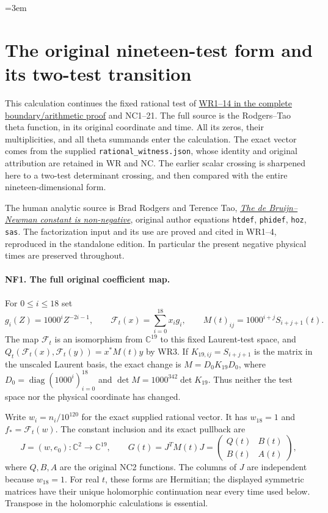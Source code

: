 \begingroup
\emergencystretch=3em
\section{The original nineteen-test form and its two-test transition}
\label{sec:native-full-flag}

This calculation continues the fixed rational test of
\href{https://github.com/KokunoYumeto/zeta-function-research-reader/blob/87e386271c488ce5914b9926c4d23d0857e0c367/workbenches/splitzero-tandem/continuations/20260923-boundary-residue-arithmetic/BOUNDARY_RESIDUE_ARITHMETIC_RECEIVERS.tex}
{WR1--14 in the complete boundary/arithmetic proof} and
NC1--21. The full source is the Rodgers--Tao theta function, in its
original coordinate and time. All its zeros, their multiplicities,
and all theta summands enter the calculation. The exact vector comes
from the supplied \texttt{rational\_witness.json}, whose identity and
original attribution are retained in WR and NC. The earlier scalar
crossing is sharpened here to a two-test determinant crossing, and
then compared with the entire nineteen-dimensional form.

The human analytic source is Brad Rodgers and Terence Tao,
\href{https://arxiv.org/abs/1801.05914v5}{\emph{The de Bruijn--Newman
constant is non-negative}}, original author equations
\texttt{htdef}, \texttt{phidef}, \texttt{hoz}, \texttt{sas}.
The factorization input and its use are proved and cited in WR1--4,
reproduced in the standalone edition. In particular the present
negative physical times are preserved throughout.

\paragraph{NF1. The full original coefficient map.}
For $0\le i\le18$ set
\[
 g_i(Z)=1000^iZ^{-2i-1},\qquad
 \mathcal F_t(x)=\sum_{i=0}^{18}x_i g_i,
 \qquad M(t)_{ij}=1000^{i+j}S_{i+j+1}(t).
 \tag{NF1}
\]
The map $\mathcal F_t$ is an isomorphism from $\mathbb C^{19}$ to
this fixed Laurent-test space, and
$Q_t(\mathcal F_t(x),\mathcal F_t(y))=x^*M(t)y$ by WR3.
If $K_{19,ij}=S_{i+j+1}$ is the matrix in the unscaled Laurent
basis, the exact change is $M=D_0K_{19}D_0$, where
$D_0=\operatorname{diag}(1000^i)_{i=0}^{18}$ and
$\det M=1000^{342}\det K_{19}$. Thus neither the test space nor
the physical coordinate has changed.

Write $w_i=n_i/10^{120}$ for the exact supplied rational vector.
It has $w_{18}=1$ and $f_* =\mathcal F_t(w)$. The constant
inclusion and its exact pullback are
\[
 J=(w,e_0):\mathbb C^2\longrightarrow\mathbb C^{19},\qquad
 G(t)=J^TM(t)J=
 \begin{pmatrix}Q(t)&B(t)\\B(t)&A(t)\end{pmatrix},
 \tag{NF2}
\]
where $Q,B,A$ are the original NC2 functions. The columns of $J$
are independent because $w_{18}=1$. For real $t$, these forms are
Hermitian; the displayed symmetric matrices have their unique
holomorphic continuation near every time used below. Transpose in
the holomorphic calculations is essential.

